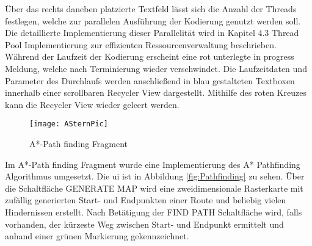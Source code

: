 Über das rechts daneben platzierte Textfeld lässt sich die Anzahl der Threads festlegen, welche zur parallelen Ausführung der Kodierung genutzt werden soll. Die detaillierte Implementierung dieser Parallelität wird in Kapitel 4.3 \glqq Thread Pool Implementierung zur effizienten Ressourcenverwaltung\grqq{} beschrieben. Während der Laufzeit der Kodierung erscheint eine rot unterlegte \glqq in progress\grqq{} Meldung, welche nach Terminierung wieder verschwindet. Die Laufzeitdaten und Parameter des Durchlaufs werden anschließend in blau gestalteten Textboxen innerhalb einer scrollbaren Recycler View dargestellt. Mithilfe des roten Kreuzes kann die Recycler View wieder geleert werden.
\begin{figure}[H]
\begin{center}
	\texttt{[image: ASternPic]}
	\caption{A*-Path finding Fragment}
	\label{fig:Pathfinding} 
\end{center}
\end{figure}
Im A*-Path finding Fragment wurde eine Implementierung des A* Pathfinding Algorithmus umgesetzt. Die \ac{ui} ist in Abbildung \autoref{fig:Pathfinding} zu sehen. Über die Schaltfläche \glqq GENERATE MAP\grqq{} wird eine zweidimensionale Rasterkarte mit zufällig generierten Start- und Endpunkten einer Route und beliebig vielen Hindernissen erstellt. Nach Betätigung der \glqq FIND PATH\grqq{} Schaltfläche wird, falls vorhanden, der kürzeste Weg zwischen Start- und Endpunkt ermittelt und anhand einer grünen Markierung gekennzeichnet.

